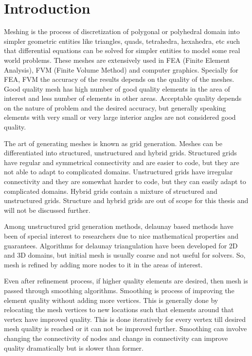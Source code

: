 \chapter{Introduction}
Meshing is the process of discretization of polygonal or polyhedral domain into simpler geometric entities like triangles, quads, tetrahedra, hexahedra, etc such that differential equations can be solved for simpler entities to model some real world problems. These meshes are extensively used in FEA (Finite Element Analysis), FVM (Finite Volume Method) and computer graphics. Specially for FEA, FVM the accuracy of the results depends on the quality of the meshes. Good quality mesh has high number of good quality elements in the area of interest and less number of elements in other areas. Acceptable quality depends on the nature of problem and the desired accuracy, but generally speaking elements with very small or very large interior angles are
not considered good quality.

The art of generating meshes is known as grid generation. Meshes can be differentiated into structured, unstructured and hybrid grids. Structured grids have regular and symmetrical connectivity and are easier to code, but they are not able to adapt to complicated domains. Unstructured grids have irregular connectivity and they are somewhat harder to code, but they can easily adapt to complicated domains. Hybrid grids contain a mixture of structured and unstructured grids. Structure and hybrid grids are out of scope for this thesis and will not be discussed further.

Among unstructured grid generation methods, delaunay based methods have been of special interest to researchers due to nice mathematical properties and guarantees. Algorithms for delaunay triangulation have been developed for 2D and 3D domains, but initial mesh is usually coarse and not useful for solvers. So, mesh is refined by adding more nodes to it in the areas of interest. 

Even after refinement process, if higher quality elements are desired, then mesh is passed through smoothing algorithms. Smoothing is process of improving the element quality without adding more vertices. This is generally done by relocating the mesh vertices to new locations such that elements around that vertex have improved quality. This is done iteratively for every vertex till desired mesh quality is reached or it can not be improved further. Smoothing can involve changing the connectivity of nodes and change in connectivity can improve quality dramatically but is slower than former.

